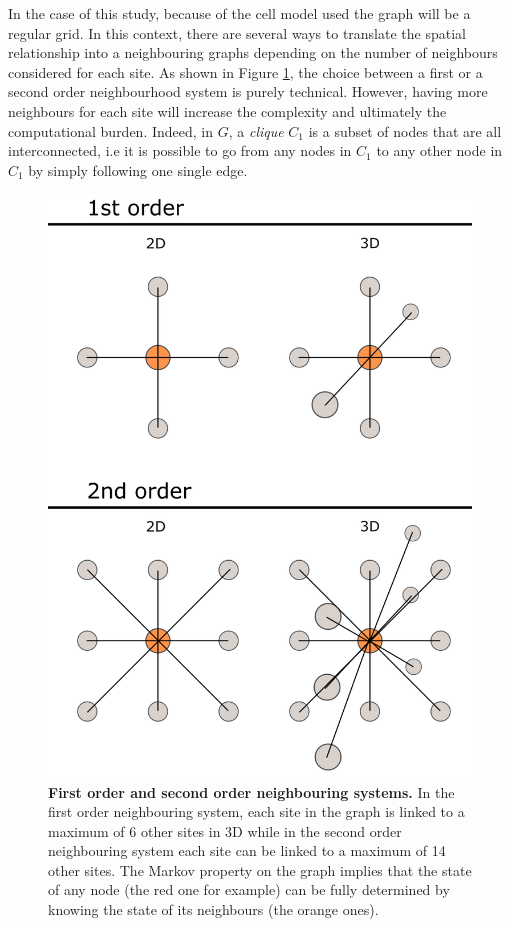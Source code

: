 In the case of this study, because of the cell model used the graph will be a regular grid. In this context, there are several ways to translate the spatial relationship into a neighbouring graphs depending on the number of neighbours considered for each site. As shown in Figure \ref{fig:graph}, the choice between a first or a second order neighbourhood system is purely technical. However, having more neighbours for each site will increase the complexity and ultimately the computational burden. Indeed, in $G$, a \emph{clique} $C_1$ is a subset of nodes that are all interconnected, i.e it is possible to go from any nodes in $C_1$ to any other node in $C_1$ by simply following one single edge.\\

	\begin{figure}[H]
\centerline{\includegraphics[width=0.8\linewidth]{gfx/chapter4/graph.png}}
\caption{{\bf First order and second order neighbouring systems.} In the first order neighbouring system, each site in the graph is linked to a maximum of 6 other sites in 3D while in the second order neighbouring system each site can be linked to a maximum of 14 other sites. The Markov property on the graph implies that the state of any node (the red one for example) can be fully determined by knowing the state of its neighbours (the orange ones).}\label{fig:graph}
	\end{figure}

